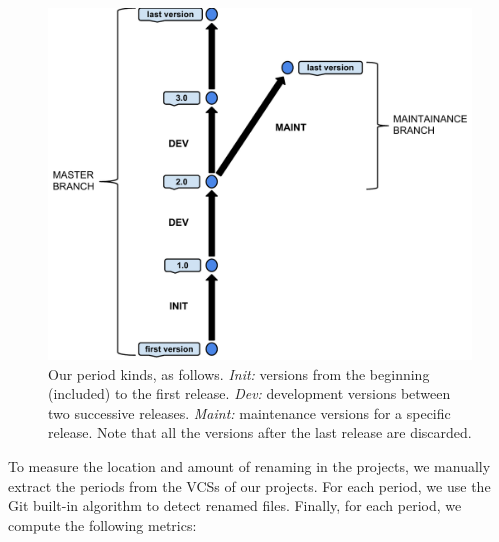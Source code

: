\begin{figure}[t]
	\centering
	\includegraphics[width=1\linewidth,keepaspectratio]{data/figures/periods.pdf}
	\caption{Our period kinds, as follows. \emph{Init:} versions from the beginning (included) to the first release. \emph{Dev:} development versions between two successive releases. \emph{Maint:} maintenance versions for a specific release. Note that all the versions after the last release are discarded.}
	\label{fig:periods}
\end{figure}

To measure the location and amount of renaming in the projects, we manually extract the periods from the VCSs of our projects. For each period, we use the Git built-in algorithm to detect renamed files. Finally, for each period, we compute the following metrics:

